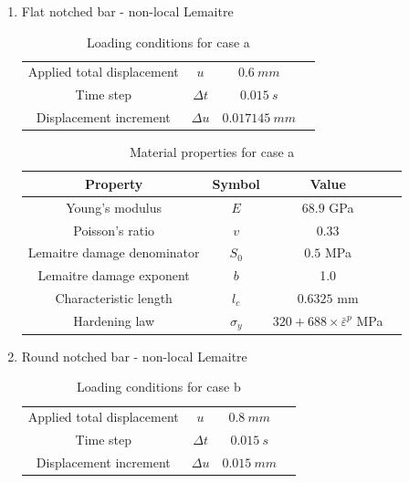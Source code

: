 \documentclass[sn-mathphys,Numbered,draft]{sn-jnl}%
\begin{document}
\begin{enumerate}[label=(\alph*)]
\item Flat notched bar - non-local Lemaitre

\begin{table}[htb]
	\centering
		\begin{tabular}{cccc} \hline
		    Applied total displacement & $u$ & $0.6\ mm$ \\
		    Time step & $\Delta t$ & $0.015\ s$ \\
			Displacement increment  & $\Delta u$ & $0.017145\ mm$   \\
			\hline
		\end{tabular}
	\caption{Loading conditions for case a}
	\label{tab:material_properties}
\end{table}

\begin{table}[htb]
	\centering
		\begin{tabular}{cccc} \hline
			Property & Symbol & Value  \\ \hline 
			Young's modulus & $E$ & $68.9$ GPa \\
			Poisson's ratio & $v$ & $0.33$   \\
			Lemaitre damage denominator & $S_0$ & $0.5$ MPa  \\
			Lemaitre damage exponent & $b$ & 1.0  \\
			Characteristic length & $l_c$ & $0.6325$ mm  \\
			Hardening law & $\sigma_y$ & $320+688\times\bar{\varepsilon}^p$ MPa \\
			\hline
		\end{tabular}
	\caption{Material properties for case a}
	\label{tab:material_properties}
\end{table}

\item Round notched bar - non-local Lemaitre
\begin{table}[htb]
	\centering
		\begin{tabular}{cccc} \hline
		    Applied total displacement & $u$ & $0.8\ mm$ \\
		    Time step & $\Delta t$ & $0.015\ s$ \\
			Displacement increment  & $\Delta u$ & $0.015\ mm$   \\
			\hline
		\end{tabular}
	\caption{Loading conditions for case b}
	\label{tab:material_properties}
\end{table}


\end{enumerate}
\end{document}
